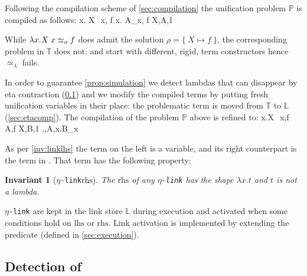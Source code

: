 \documentclass[sigconf,natbib=false,review]{acmart}
\newtheorem{invariant}{Invariant}
\newcommand{\appsep}{\ensuremath{\textcolor{lightgray}{\cdot}}}
\newcommand{\UnifRel}{\ensuremath{\simeq}}
\newcommand{\Uo}{\ensuremath{\UnifRel_o}\xspace}
\newcommand{\Ue}{\ensuremath{\UnifRel_\lambda}\xspace}
\newcommand{\linkMacro}[1]{\ensuremath{#1}\texttt{-link}\xspace}
\newcommand{\linketa} {\linkMacro{\eta}}
\newcommand{\lhs}{\ensuremath{\mathrm{lhs}}\xspace}
\newcommand{\rhs}{\ensuremath{\mathrm{rhs}}\xspace}
\newcommand{\linkStore}{\ensuremath{\mathbb{L}}\xspace}
\newcommand{\foUnifPb}{\ensuremath{\mathbb{P}}\xspace}
\newcommand{\hoUnifPb}{\ensuremath{\mathbb{T}}\xspace}
\begin{document}
Following the compilation scheme of \cref{sec:compilation} the
unification problem \foUnifPb is compiled as follows:
%
\printAlll
  {{{\lambda x. X \appsep x, f}}}
  {{{\lambda x. A_x, f}}}
  {{{X,A,1}}}
  {{}}

\noindent
While $\lambda x.X \appsep x \Uo{} f$ does admit the solution
$\rho = \{~ X \mapsto f ~\}$, the corresponding problem in
\hoUnifPb does not:
 and
 start with different, rigid, term constructors hence
\Ue{} fails.

In order to guarantee \cref{prop:simulation} we detect
lambdas that can disappear by eta contraction (\cref{sec:etadetection}) and
we modify the compiled terms by putting fresh unification variables
in their place: the problematic term is moved 
from  \hoUnifPb to \linkStore (\cref{sec:etacomp}). The compilation
of the problem \foUnifPb above is refined to: 
%
\printAlll
  {{{\lambda x.X \appsep x,f}}}
  {{{A,f}}}
  {{{X,B,1}}}
  {{{\eta,,A,\lambda x.B_x}}}

\noindent
As per \cref{inv:linklhs} the term on the left is a variable, and its
right counterpart is the
term in \maybeeta. That term has the following property:

\begin{invariant}[\linketa \rhs]
  The \rhs of any \linketa %
  has the shape $\lambda x.t$
  and $t$ is not a lambda. 
  \label{inv:link-eta-right}
\end{invariant}

\linketa are kept in the link store \linkStore during execution
and activated when some conditions hold on \lhs or \rhs.
Link activation is implemented by extending the 
predicate (defined in \cref{sec:execution}).

\subsection{Detection of \maybeeta}\label{sec:etadetection}
\end{document}

